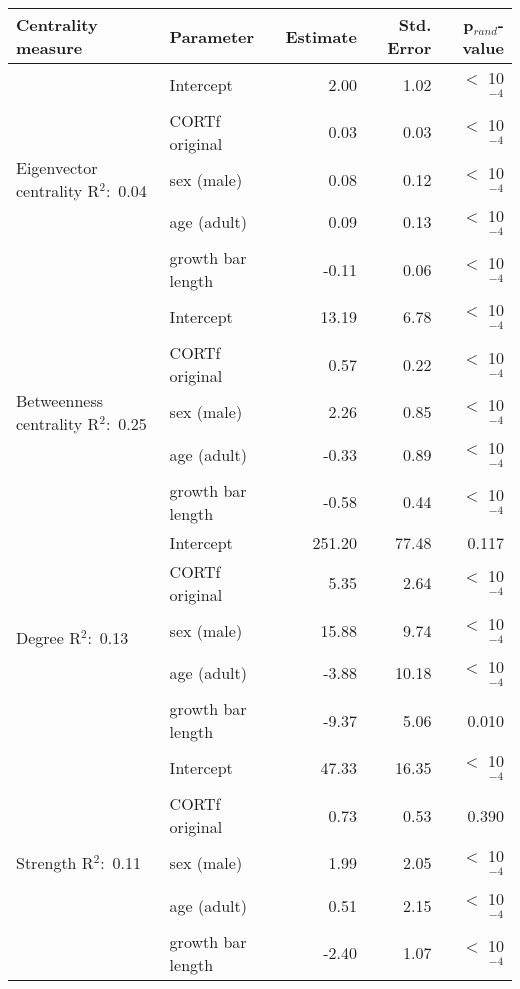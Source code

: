 \documentclass[10pt, twoside]{book} %
\begin{document}
\begin{table}[h!]
\begin{center}
\begin{footnotesize}
\begin{tabular}{p{2cm} l r r r }
				\toprule
				\textbf{Centrality measure} & \textbf{Parameter} & \textbf{Estimate} & \textbf{Std. Error} &\textbf{ p$_{rand}$-value}\\
				\hline
				\multirow{5}{2cm}{Eigenvector centrality \mbox{R$^2$: 0.04}} & Intercept & 2.00 & 1.02 & $<$ 10$^{-4}$\\
				& CORTf original & 0.03 & 0.03 & $<$ 10$^{-4}$\\
				& sex (male) & 0.08 & 0.12 & $<$ 10$^{-4}$\\
				& age (adult) & 0.09 & 0.13 &  $<$ 10$^{-4}$\\
				& growth bar length & -0.11 & 0.06 &  $<$ 10$^{-4}$\\
				\hline
				\multirow{5}{2cm}{Betweenness centrality \mbox{R$^2$: 0.25}} & Intercept & 13.19 & 6.78 & $<$ 10$^{-4}$\\
				& CORTf original & 0.57 & 0.22 & $<$ 10$^{-4}$\\
				& sex (male) & 2.26 & 0.85 & $<$ 10$^{-4}$\\
				& age (adult) & -0.33 & 0.89 & $<$ 10$^{-4}$\\
				& growth bar length & -0.58 & 0.44 & $<$ 10$^{-4}$\\
				\hline
				\multirow{5}{2cm}{Degree \mbox{R$^2$: 0.13}} & Intercept & 251.20 & 77.48 & 0.117\\
				& CORTf original & 5.35 & 2.64 & $<$ 10$^{-4}$\\
				& sex (male) & 15.88 & 9.74 & $<$ 10$^{-4}$\\
				& age (adult) & -3.88 & 10.18 & $<$ 10$^{-4}$\\
				& growth bar length & -9.37 & 5.06 & 0.010\\
				\hline
				\multirow{5}{2cm}{Strength \mbox{R$^2$: 0.11}} & Intercept & 47.33 & 16.35 & $<$ 10$^{-4}$\\
				& CORTf original & 0.73 & 0.53 & 0.390\\
				& sex (male) & 1.99 & 2.05 & $<$ 10$^{-4}$\\
				& age (adult) & 0.51 & 2.15 & $<$ 10$^{-4}$\\
				& growth bar length & -2.40 & 1.07 & $<$ 10$^{-4}$\\
				\bottomrule
			\end{tabular}\endgroup
		\end{footnotesize}
	\end{center}
\end{table}
\end{document}
